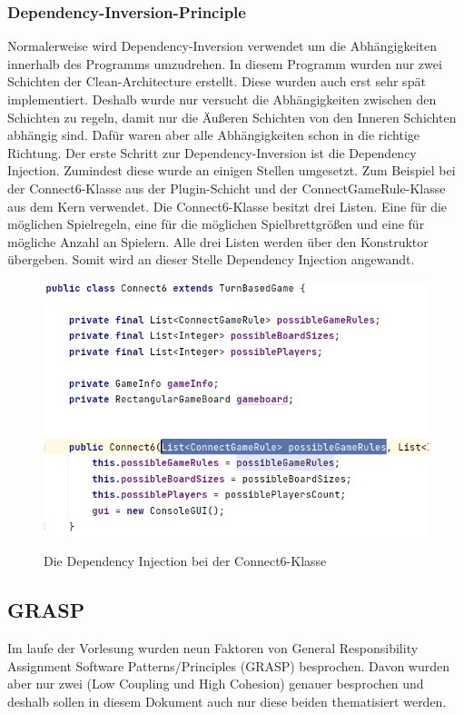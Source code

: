 \documentclass[12pt]{article}
\begin{document}
\subsubsection{Dependency-Inversion-Principle}
Normalerweise wird Dependency-Inversion verwendet um die Abhängigkeiten innerhalb des Programms umzudrehen. In diesem Programm wurden nur zwei Schichten der Clean-Architecture erstellt. Diese wurden auch erst sehr spät implementiert. Deshalb wurde nur versucht die Abhängigkeiten zwischen den Schichten zu regeln, damit nur die Äußeren Schichten von den Inneren Schichten abhängig sind. Dafür waren aber alle Abhängigkeiten schon in die richtige Richtung.
Der erste Schritt zur Dependency-Inversion ist die Dependency Injection. Zumindest diese wurde an einigen Stellen umgesetzt. Zum Beispiel bei der Connect6-Klasse aus der Plugin-Schicht und der ConnectGameRule-Klasse aus dem Kern verwendet. Die Connect6-Klasse besitzt drei Listen. Eine für die möglichen Spielregeln, eine für die möglichen Spielbrettgrößen und eine für mögliche Anzahl an Spielern. Alle drei Listen werden über den Konstruktor übergeben. Somit wird an dieser Stelle Dependency Injection angewandt.


\begin{figure}[H]
\centering
{\includegraphics[width=13cm]{Bilder/DependencyInjection}}
\caption{Die Dependency Injection bei der Connect6-Klasse}
\label{fig:DependencyInjection}
\end{figure}



\subsection{GRASP}
Im laufe der Vorlesung wurden neun Faktoren von General Responsibility Assignment Software Patterns/Principles (GRASP) besprochen. Davon wurden aber nur zwei (Low Coupling und High Cohesion) genauer besprochen und deshalb sollen in diesem Dokument auch nur diese beiden thematisiert werden.
\end{document}
